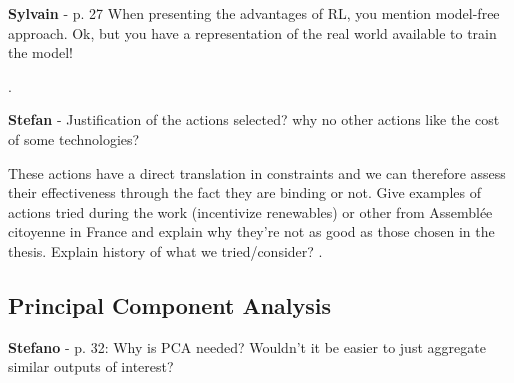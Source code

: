 \documentclass[12pt,a4paper]{article}
\begin{document}
\begin{mdframed}[style=comment] %
{\color{purple} \textbf{Sylvain}} - p. 27 When presenting the advantages of RL, you mention model-free approach. Ok, but you have a representation of the real world available to train the model!
\end{mdframed}

\noindent {\color{blue} }.

\begin{mdframed}[style=manuscript] %

\end{mdframed}

\begin{mdframed}[style=comment] %
{\color{teal} \textbf{Stefan}} - Justification of the actions selected? why no other actions like the cost of some technologies? 
\end{mdframed}

\noindent These actions have a direct translation in constraints and we can therefore assess their effectiveness through the fact they are binding or not. Give examples of actions tried during the work (incentivize renewables) or other from Assemblée citoyenne in France and explain why they’re not as good as those chosen in the thesis. Explain history of what we tried/consider? 
 {\color{blue} }.

\begin{mdframed}[style=manuscript] %

\end{mdframed}

\subsection{Principal Component Analysis}
\label{methodo_PCA}

\begin{mdframed}[style=comment] %
{\color{orange} \textbf{Stefano}} - p. 32: Why is PCA needed? Wouldn’t it be easier to just aggregate similar outputs of interest?
\end{mdframed}

\noindent 

\begin{mdframed}[style=manuscript] %

\end{mdframed}
\end{document}
